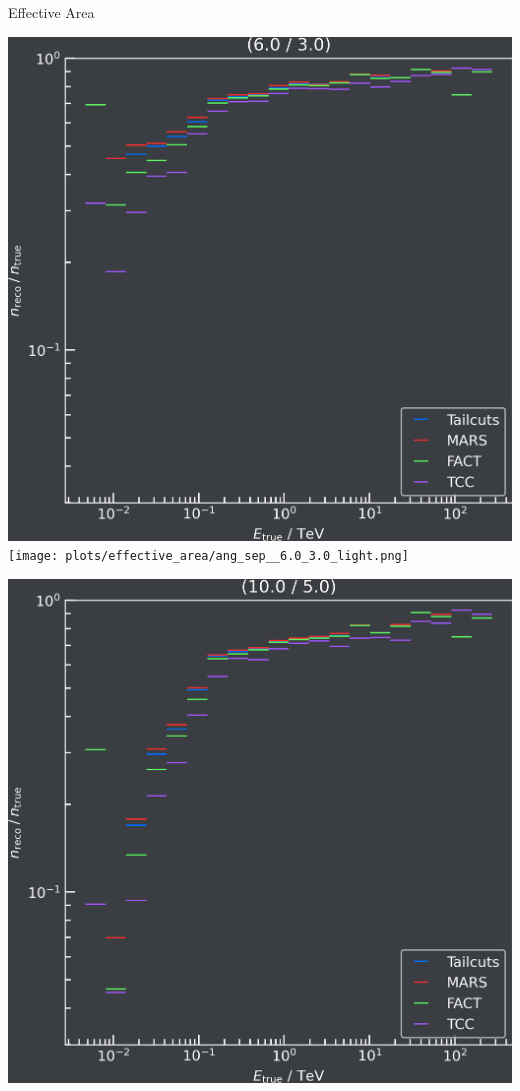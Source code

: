 \begin{frame}{Effective Area}
\begin{minipage}{0.32\textwidth}
    \fi
  \end{minipage}
  \begin{minipage}{0.32\textwidth}
    \ifdefined\darktheme
      \centering
      \includegraphics[width=\textwidth]{plots/effective_area/aeff_6.0_3.0_dark.png}
    \else
      \centering
      \texttt{[image: plots/effective\_area/ang\_sep\_\_6.0\_3.0\_light.png]}
    \fi
  \end{minipage}
  \begin{minipage}{0.32\textwidth}
    \ifdefined\darktheme
      \centering
      \includegraphics[width=\textwidth]{plots/effective_area/aeff_10.0_5.0_dark.png}

\end{minipage}
\end{frame}
